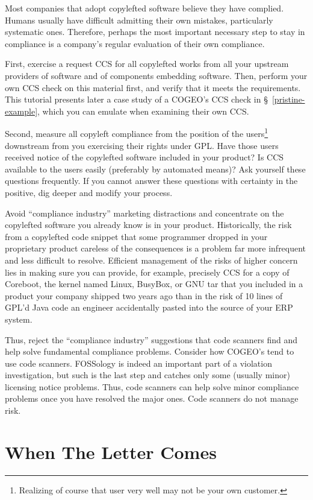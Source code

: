 Most companies that adopt copylefted software believe they have complied.
Humans usually have difficult admitting their own mistakes, particularly
systematic ones.  Therefore, perhaps the most important necessary step to
stay in compliance is a company's regular evaluation of their own compliance.

First, exercise a request CCS for all copylefted works from all your upstream
providers of software and of components embedding software.  Then, perform
your own CCS check on this material first, and verify that it meets the
requirements.  This tutorial presents later a case study of a COGEO's CCS
check in \S~\ref{pristine-example}, which you can emulate when examining
their own CCS\@.

Second, measure all copyleft compliance from the position of the
users\footnote{Realizing of course that user very well may not be your own
  customer.} downstream from you exercising their rights under GPL\@.  Have
those users received notice of the copylefted software included in your
product?  Is CCS available to the users easily (preferably by automated
means)?  Ask yourself these questions frequently.  If you cannot answer these
questions with certainty in the positive, dig deeper and modify your process.

Avoid ``compliance industry'' marketing distractions and concentrate on the
copylefted software you already know is in your product.  Historically, the
risk from a copylefted code snippet that some programmer dropped in your
proprietary product careless of the consequences is a problem far more
infrequent and less difficult to resolve.  Efficient management of the risks
of higher concern lies in making sure you can provide, for example, precisely
CCS for a copy of Coreboot, the kernel named Linux, BusyBox, or GNU tar that
you included in a product your company shipped two years ago than in the risk
of 10 lines of GPL'd Java code an engineer accidentally pasted into the
source of your ERP system.

Thus, reject the ``compliance industry'' suggestions that code scanners find
and help solve fundamental compliance problems.  Consider how COGEO's tend to
use code scanners.  FOSSology is indeed an important part of a violation
investigation, but such is the last step and catches only some (usually
minor) licensing notice problems.  Thus, code scanners can help solve minor
compliance problems once you have resolved the major ones.  Code scanners
do not manage risk.

\chapter{When The Letter Comes}

